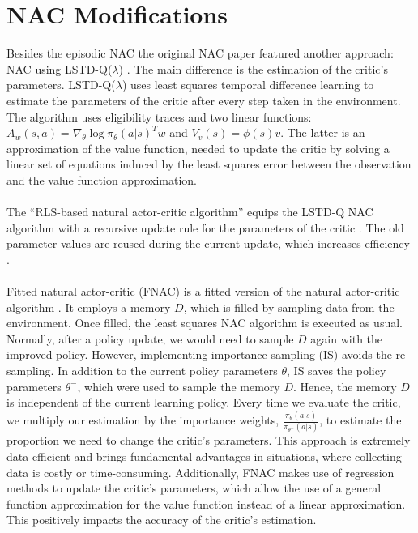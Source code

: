\section{NAC Modifications}
\label{sec:modifications}
\vspace{-2mm}
 Besides the episodic NAC the original NAC paper \citep{peters2005natural} featured another approach: NAC using LSTD-Q($\lambda$) \citep{lagoudakis2003least, boyan2002technical}. The main difference is the estimation of the critic's parameters. LSTD-Q($\lambda$) uses least squares temporal difference learning \citep{boyan1999least} to estimate the parameters of the critic after every step taken in the environment. The algorithm uses eligibility traces \cite{sutton2018reinforcement} and two linear functions: $A_w(s,a) = \nabla_{\theta} \log \pi_{\theta}(a|s)^Tw$ and $V_v(s) = \phi(s)v$.  The latter is an approximation of the value function, needed to update the critic by solving a linear set of equations induced by the least squares error between the observation and the value function approximation.
\\\\
 The ``RLS-based natural actor-critic algorithm'' equips the LSTD-Q NAC algorithm with a recursive update rule for the parameters of the critic \cite{park2005rls}. The old parameter values are reused during the current update, which increases efficiency \citep{xu2002efficient}.
\\\\
 Fitted natural actor-critic (FNAC) is a fitted version of the natural actor-critic algorithm \cite{melo2008fitted}.  It employs a memory $D$, which is filled by sampling data from the environment. Once filled, the least squares NAC algorithm is executed as usual. Normally, after a policy update, we would need to sample $D$ again with the improved policy. However, implementing importance sampling (IS) \cite{sutton2018reinforcement} avoids the re-sampling. In addition to the current policy parameters $\theta$, IS saves the policy parameters $\theta^{-}$, which were used to sample the memory $D$. Hence, the memory $D$ is independent of the current learning policy. Every time we evaluate the critic, we multiply our estimation by the importance weights, \(\tfrac{\pi_{\theta}(a|s)}{\pi_{\theta^{-}}(a|s)}\), to estimate the proportion we need to change the critic's parameters. This approach is extremely data efficient and brings fundamental advantages in situations, where collecting data is costly or time-consuming. Additionally, FNAC makes use of regression methods to update the critic's parameters, which allow the use of a general function approximation for the value function instead of a linear approximation. This positively impacts the accuracy of the critic's estimation. 
